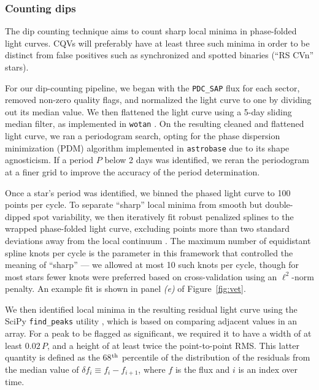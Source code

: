 \documentclass[11pt,twocolumn,tighten]{aastex63}
\begin{document}
\subsubsection{Counting dips}
\label{subsec:counting}

The dip counting technique aims to count sharp local minima in
phase-folded light curves.  CQVs will preferably have at least three
such minima in order to be distinct from false positives such as
synchronized and spotted binaries (``RS CVn'' stars). 

For our dip-counting pipeline, we began with the {\tt PDC\_SAP} flux
for each sector, removed non-zero quality flags, and normalized the
light curve to one by dividing out its median value.  We then
flattened the light curve using a 5-day sliding median filter, as
implemented in \texttt{wotan} \citep{2019AJ....158..143H}.  On the
resulting cleaned and flattened light curve, we ran a periodogram
search, opting for the \citet{1978ApJ...224..953S} phase dispersion
minimization (PDM) algorithm implemented in \texttt{astrobase}
\citep{2021zndo...1011188B} due to its shape agnosticism.  If a period
$P$ below 2 days was identified, we reran the periodogram at a finer
grid to improve the accuracy of the period determination.

Once a star's period was identified, we binned the phased light curve
to 100 points per cycle.  To separate ``sharp'' local minima from
smooth but double-dipped spot variability, we then iteratively fit
robust penalized splines to the wrapped phase-folded light curve,
excluding points more than two standard deviations away from the local
continuum \citep{2019AJ....158..143H}.  The maximum number of
equidistant spline knots per cycle is the parameter in this framework
that controlled the meaning of ``sharp'' --- we allowed at most 10
such knots per cycle, though for most stars fewer knots were preferred
based on cross-validation using an $\ell^2$-norm penalty.  An example
fit is shown in panel {\it (e)} of Figure~\ref{fig:vet}.

We then identified local minima in the resulting residual light curve
using the SciPy \texttt{find\_peaks} utility
\citep{2020NatMe..17..261V}, which is based on comparing adjacent
values in an array.  For a peak to be flagged as significant, we
required it to have a width of at least $0.02\,P$, and a height of at
least twice the point-to-point RMS.  This latter quantity is defined
as the 68$^{\rm th}$ percentile of the distribution of the residuals
from the median value of $\delta f_i \equiv f_i - f_{i+1}$, where $f$
is the flux and $i$ is an index over time.
\end{document}

